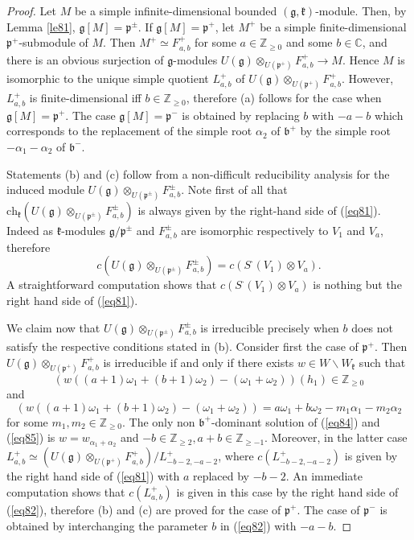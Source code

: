 \documentclass[12pt]{amsart}
\theoremstyle{plain} %
\newcommand{\ch}{\mathrm{ch}}
\newcommand {\ZZ} {\mathbb {Z}}
\newcommand {\CC} {\mathbb {C}}
\newcommand{\kk}{\mathfrak{k}}
\renewcommand{\gg}{\mathfrak{g}}
\newcommand{\bb}{\mathfrak{b}}
\newcommand{\pp}{\mathfrak{p}}
\newcommand{\refle}[1]{Lemma \ref{#1}}
\newcommand{\refeq}[1]{(\ref{#1})}
\begin{document}
\begin{proof}
Let $M$ be a simple infinite-dimensional bounded
$(\gg,\kk)$-module. Then, by \refle{le81}, $\gg[M] =\pp^\pm$. If
$\gg[M]=\pp^+$, let $M^+$ be a simple finite-dimensional
$\pp^+$-submodule of $M$. Then $M^+\simeq F^{+}_{a,b}$ for some
$a\in\ZZ_{\geq 0}$ and some $b\in \CC$, and there is an obvious
surjection of $\gg$-modules $U(\gg)\otimes_{U(\pp^+)}F^+_{a,b}\to
M$. Hence $M$ is isomorphic to the unique simple quotient $L_{a,b}^+$
of $U(\gg)\otimes_{U(\pp^+)} F_{a,b}^+$. However, $L_{a,b}^+$ is
finite-dimensional iff $b\in\ZZ_{\geq 0}$, therefore (a) follows for
the case when $\gg[M]=\pp^+$. The case $\gg[M]=\pp^-$ is obtained by replacing $b$ with $-a-b$ which corresponds to the replacement of the simple root $\alpha_2$ of $\bb^+$ by the simple root $-\alpha_1-\alpha_2$ of $\bb^-$.

Statements (b) and (c) follow from a non-difficult reducibility
analysis for the induced module $U(\gg)\otimes_{U(\pp^\pm)} F_{a,b}^\pm$. Note first of all that $\ch_\kk(U(\gg)\otimes_{U(\pp^\pm)} F_{a,b}^\pm)$ is always given by the right-hand side of \refeq{eq81}. Indeed as $\kk$-modules $\gg/\pp^\pm$ and $F_{a,b}^\pm$ are isomorphic respectively to $V_1$ and $V_a$, therefore
\[
c(U(\gg)\otimes_{U(\pp^\pm)} F_{a,b}^\pm)=c(S^\cdot(V_1)\otimes V_a).
\]
A straightforward computation shows that $c(S^\cdot(V_1)\otimes V_a)$ is nothing but the right hand side of \refeq{eq81}.

We claim now that $U(\gg)\otimes_{U(\pp^\pm)} F_{a,b}^\pm$ is irreducible precisely when $b$ does not satisfy the respective conditions stated in (b). Consider first the case of $\pp^+$. Then $U(\gg)\otimes_{U(\pp^+)} F_{a,b}^+$ is irreducible if and only if there exists $w\in W\backslash W_\kk$ such that
\begin{equation}\label{eq84}
(w((a+1)\omega_1+(b+1)\omega_2)-(\omega_1+\omega_2))(h_1)\in \ZZ_{\geq 0}
\end{equation}
and
\begin{equation}\label{eq85}
(w((a+1)\omega_1+(b+1)\omega_2)-(\omega_1+\omega_2))=a\omega_1+b\omega_2-m_1\alpha_1-m_2\alpha_2
\end{equation}
for some $m_1,m_2\in \ZZ_{\geq 0}$. The only non $\bb^+$-dominant solution of \refeq{eq84} and \refeq{eq85} is $w=w_{\alpha_1+\alpha_2}$ and $-b\in \ZZ_{\geq 2}, a+b\in\ZZ_{\geq -1}$. Moreover, in the latter case $L_{a,b}^+\simeq(U(\gg)\otimes_{U(\pp^+)} F_{a,b}^+)/L_{-b-2,-a-2}^+$, where $c(L^+_{-b-2,-a-2})$ is given by the right hand side of \refeq{eq81} with $a$ replaced by $-b-2$. An immediate computation shows that $c( L_{a,b}^+)$ is given in this case by the right hand side of \refeq{eq82}, therefore (b) and (c) are proved for the case of $\pp^+$. The case of $\pp^-$ is obtained by interchanging the parameter $b$ in \refeq{eq82} with $-a-b$.
\end{proof}
\end{document}
